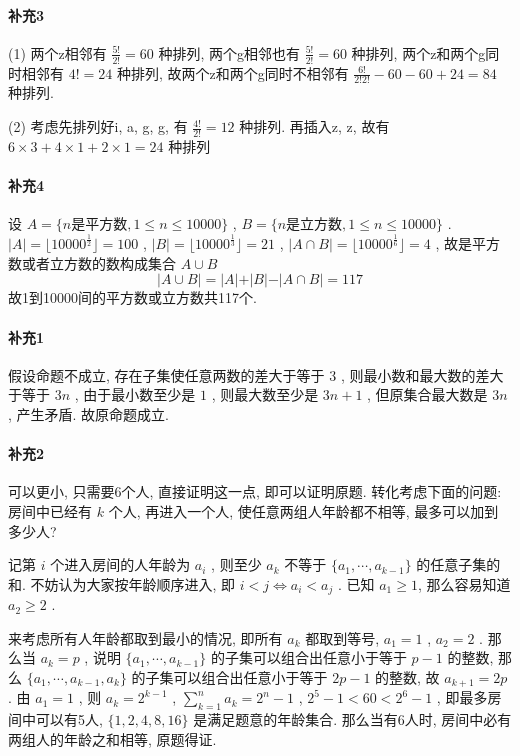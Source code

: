 \documentclass[a4paper, UTF8]{ctexart}				%
\numberwithin{equation}{section}				%
\begin{document}
    \paragraph{补充3}
        (1) 两个z相邻有 $\frac{5!}{2!} = 60$ 种排列, 两个g相邻也有 $\frac{5!}{2!} = 60$ 种排列, 两个z和两个g同时相邻有 $4! = 24$ 种排列, 故两个z和两个g同时不相邻有 $\frac{6!}{2!2!} - 60 - 60 + 24 = 84$ 种排列.

        (2) 考虑先排列好i, a, g, g, 有 $\frac{4!}{2!} = 12$ 种排列. 再插入z, z, 故有 $6 \times 3 + 4 \times 1 + 2 \times 1 = 24$ 种排列
    \paragraph{补充4} 
        设 $A = \{n\text{是平方数}, 1 \le n \le 10000\}$ , $B = \{n\text{是立方数}, 1 \le n \le 10000\}$ . $\vert{A}\vert = \lfloor{10000^{\frac{1}{2}}}\rfloor = 100$ , $\vert{B}\vert = \lfloor{10000^{\frac{1}{3}}}\rfloor = 21$ , $\vert{A \cap B}\vert = \lfloor{10000^{\frac{1}{6}}}\rfloor = 4$ , 故是平方数或者立方数的数构成集合 $A \cup B$ 
        \[
            \vert{A \cup B}\vert = \vert{A}\vert + \vert{B}\vert - \vert{A \cap B}\vert = 117
        \]
        故1到10000间的平方数或立方数共117个.
    \paragraph{补充1} 
        假设命题不成立, 存在子集使任意两数的差大于等于 $3$ , 则最小数和最大数的差大于等于 $3n$ , 由于最小数至少是 $1$ , 则最大数至少是 $3n + 1$ , 但原集合最大数是 $3n$ , 产生矛盾. 故原命题成立.
    \paragraph{补充2} 
        可以更小, 只需要6个人, 直接证明这一点, 即可以证明原题. 转化考虑下面的问题: 房间中已经有 $k$ 个人, 再进入一个人, 使任意两组人年龄都不相等, 最多可以加到多少人?

        记第 $i$ 个进入房间的人年龄为 $a_i$ , 则至少 $a_k$ 不等于 $\{a_1, \cdots, a_{k-1}\}$ 的任意子集的和. 不妨认为大家按年龄顺序进入, 即 $i < j \Leftrightarrow a_i < a_j$ . 已知 $a_1 \ge 1$, 那么容易知道 $a_2 \ge 2$ . 
        
        来考虑所有人年龄都取到最小的情况, 即所有 $a_k$ 都取到等号, $a_1 = 1$ , $a_2 = 2$ . 那么当 $a_k = p$ , 说明 $\{a_1, \cdots, a_{k-1}\}$ 的子集可以组合出任意小于等于 $p - 1$ 的整数, 那么 $\{a_1, \cdots, a_{k-1}, a_k\}$ 的子集可以组合出任意小于等于 $2p - 1$ 的整数, 故 $a_{k+1} = 2p$ . 由 $a_1 = 1$ , 则 $a_k = 2^{k-1}$ , $\sum^{n}_{k = 1} a_k = 2^n - 1$ , $2^5 - 1 < 60 < 2^6 - 1$ , 即最多房间中可以有5人, $\{1, 2, 4, 8, 16\}$ 是满足题意的年龄集合. 那么当有6人时, 房间中必有两组人的年龄之和相等, 原题得证.
\end{document}
